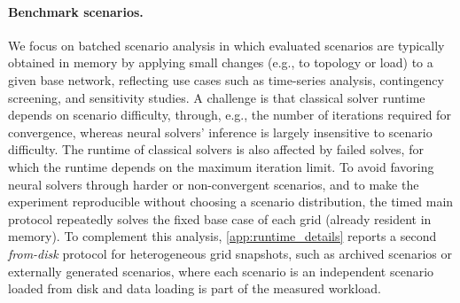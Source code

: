 \paragraph{Benchmark scenarios.}
We focus on batched scenario analysis in which evaluated scenarios are typically obtained in memory by applying small changes (e.g., to topology or load) to a given base network, reflecting use cases such as time-series analysis, contingency screening, and sensitivity studies. A challenge is that classical solver runtime depends on scenario difficulty, through, e.g., the number of iterations required for convergence, whereas neural solvers' inference is largely insensitive to scenario difficulty. The runtime of classical solvers is also affected by failed solves, for which the runtime depends on the maximum iteration limit. To avoid favoring neural solvers through harder or non-convergent scenarios, and to make the experiment reproducible without choosing a scenario distribution, the timed main protocol repeatedly solves the fixed base case of each grid (already resident in memory). To complement this analysis, \cref{app:runtime_details} reports a second \emph{from-disk} protocol for heterogeneous grid snapshots, such as archived scenarios or externally generated scenarios, where each scenario is an independent \datakit scenario loaded from disk and data loading is part of the measured workload.\\


